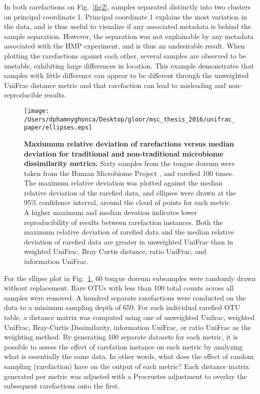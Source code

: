 \documentclass[10pt,letterpaper]{article}
\begin{document}
In both rarefactions on Fig.~\ref{fig2}, samples separated distinctly into two clusters on principal coordinate 1. Principal coordinate 1 explains the most variation in the data, and is thus useful to visualize if any associated metadata is behind the sample separation. However, the separation was not explainable by any metadata associated with the HMP experiment, and is thus an undesirable result. When plotting the rarefactions against each other, several samples are observed to be unstable, exhibiting large differences in location. This example demonstrates that samples with little difference can appear to be different through the unweighted UniFrac distance metric and that rarefaction can lead to misleading and non-reproducible results.

\begin{figure}[h]
\texttt{[image: /Users/dphamnyghonca/Desktop/gloor/msc\_thesis\_2016/unifrac\_paper/ellipses.eps]}
\caption[Maxiumum relative deviation of rarefactions versus median deviation for traditional and non-traditional microbiome dissimilarity metrics.]{{\bf Maxiumum relative deviation of rarefactions versus median deviation for traditional and non-traditional microbiome dissimilarity metrics.} Sixty samples from the tongue dorsum were taken from the Human Microbiome Project \cite{turnbaugh2007human}, and rarefied 100 times. The maximum relative deviation was plotted against the median relative deviation of the rarefied data, and ellipses were drawn at the 95\% confidence interval, around the cloud of points for each metric. A higher maximum and median devation indicates lower reproducibility of results between rarefaction instances. Both the maximum relative deviation of rarefied data and the median relative deviation of rarefied data are greater in unweighted UniFrac than in weighted UniFrac, Bray Curtis distance, ratio UniFrac, and information UniFrac.}
\label{fig3}
\end{figure}

For the ellipse plot in Fig.~\ref{fig3}, 60 tongue dorsum subsamples were randomly drawn without replacement. Rare OTUs with less than 100 total counts across all samples were removed. A hundred separate rarefactions were conducted on the data to a minimum sampling depth of 659. For each individual rarefied OTU table, a distance matrix was computed using one of unweighted Unifrac, weighted UniFrac, Bray-Curtis Dissimilarity, information UniFrac, or ratio UniFrac as the weighting method. By generating 100 separate datasets for each metric, it is possible to assess the effect of rarefation instance on each metric by analyzing what is essentially the same data. In other words, what does the effect of random sampling (rarefaction) have on the output of each metric? Each distance matrix generated per metric was adjusted with a Procrustes adjustment to overlay the subsequent rarefactions onto the first.
\end{document}
